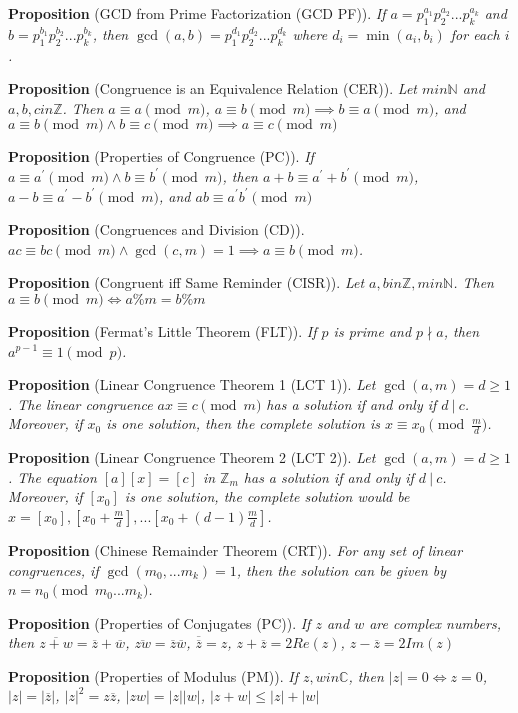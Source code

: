\documentclass[12pt]{article}
\newcommand{\divides}{\ \!|\ \!}
\newcommand{\propositionlist}[2]{{\bf Proposition} (#1). \emph{#2}}
\begin{document}
\propositionlist{GCD from Prime Factorization (GCD PF)}{If $a = p_1^{a_1} p_2^{a_2} ... p_k^{a_k}$ and $b = p_1^{b_1} p_2^{b_2} ... p_k^{b_k}$, then $\gcd(a,b) = p_1^{d_1} p_2^{d_2} ... p_k^{d_k}$ where $d_i = \min(a_i,b_i)$ for each $i$.}

\propositionlist{Congruence is an Equivalence Relation (CER)}{Let $m in \mathbb{N}$ and $a,b,c in \mathbb{Z}$. Then $a \equiv a \pmod m$, $a \equiv b \pmod m \implies b \equiv a \pmod m$, and $a \equiv b \pmod m \land b \equiv c \pmod m \implies a \equiv c \pmod m$}

\propositionlist{Properties of Congruence (PC)}{If $a \equiv a^\prime \pmod m \land b \equiv b^\prime \pmod m$, then $a + b \equiv a^\prime + b^\prime \pmod m$, $a - b \equiv a^\prime - b^\prime \pmod m$, and $ab \equiv a^\prime b^\prime \pmod m$}

\propositionlist{Congruences and Division (CD)}{$ac \equiv bc \pmod m \land \gcd(c,m) = 1 \implies a \equiv b \pmod m$.}

\propositionlist{Congruent iff Same Reminder (CISR)}{Let $a,b in \mathbb{Z}, m in \mathbb{N}$. Then $a \equiv b \pmod m \iff a \% m = b \% m$}

\propositionlist{Fermat's Little Theorem (FLT)}{If $p$ is prime and $p \nmid a$, then $a^{p-1} \equiv 1 \pmod p$.}

\propositionlist{Linear Congruence Theorem 1 (LCT 1)}{Let $\gcd(a,m) = d \geq 1$. The linear congruence $ax \equiv c \pmod m$ has a solution if and only if $d\divides c$. Moreover, if $x_0$ is one solution, then the complete solution is $x \equiv x_0 \pmod \frac{m}{d}$.}

\propositionlist{Linear Congruence Theorem 2 (LCT 2)}{Let $\gcd(a,m) = d \geq 1$. The equation $[a][x] = [c]$ in $\mathbb{Z}_m$ has a solution if and only if $d\divides c$. Moreover, if $[x_0]$ is one solution, the complete solution would be $x = [x_0], [x_0 + \frac{m}{d}], ... [x_0 + (d-1)\frac{m}{d}]$.}

\propositionlist{Chinese Remainder Theorem (CRT)}{For any set of linear congruences, if $\gcd(m_0,...m_k) = 1$, then the solution can be given by $n = n_0 \pmod {m_0...m_k}$.}

\propositionlist{Properties of Conjugates (PC)}{If $z$ and $w$ are complex numbers, then $\overline{z + w} = \overline{z} + \overline{w}$, $\overline{zw} = \overline{z}\overline{w}$, $\overline{\overline{z}} = z$, $z + \overline{z} = 2Re(z)$, $z - \overline{z} = 2Im(z)$}

\propositionlist{Properties of Modulus (PM)}{If $z, w in \mathbb{C}$, then $|z| = 0 \iff z = 0$, $|z| = |\overline{z}|$, ${|z|}^2 = z\overline{z}$, $|zw| = |z||w|$, $|z+w| \leq |z| + |w|$}
\end{document}
